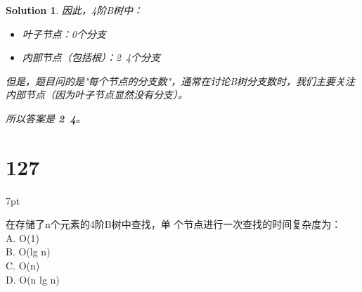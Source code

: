 \documentclass[UTF8]{report}
\newtheorem{solution}{Solution}
\theoremstyle{MyLineTheoremStyle} %
\theoremstyle{MyBlockTheoremStyle} %
\theoremstyle{MySubsubsectionStyle} %
\newenvironment{graybox}{%
        \def\FrameCommand{%
        \hspace{1pt}%
        {\color{gray}\small \vrule width 2pt}%
        {\color{graybox_color}\vrule width 4pt}%
        \colorbox{graybox_color}%
        }%
        \MakeFramed{\advance\hsize-\width\FrameRestore}%
        \noindent\hspace{-4.55pt}%
        \begin{adjustwidth}{}{7pt}%
        \vspace{2pt}\vspace{2pt}%
        }
        {%
        \vspace{2pt}\end{adjustwidth}\endMakeFramed%
        }
\begin{document}
\begin{solution}
因此，4阶B树中：
\begin{itemize}
    \item 叶子节点：0个分支
    \item 内部节点（包括根）：2~4个分支
\end{itemize}

但是，题目问的是"每个节点的分支数"，通常在讨论B树分支数时，我们主要关注内部节点（因为叶子节点显然没有分支）。

所以答案是 \textbf{2~4}。
\end{solution}


\section*{127}
\begin{graybox}
在存储了n个元素的4阶B树中查找，单
个节点进行一次查找的时间复杂度为：\\
A. O(1)\\
B. O(lg n)\\
C. O(n)\\
D. O(n lg n)
\end{graybox}
\end{document}
